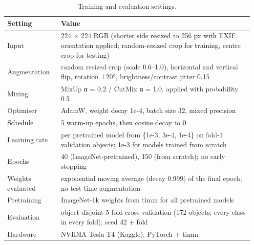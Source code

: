 \begin{table}
\caption{Training and evaluation settings.}
\label{tab:table_training_settings}
\begin{tabular}{ll}
\toprule
Setting & Value \\
\midrule
Input & 224 × 224 RGB (shorter side resized to 256 px with EXIF orientation applied; random-resized crop for training, centre crop for testing) \\
Augmentation & random resized crop (scale 0.6–1.0), horizontal and vertical flip, rotation ±20°, brightness/contrast jitter 0.15 \\
Mixing & MixUp α = 0.2 / CutMix α = 1.0, applied with probability 0.5 \\
Optimiser & AdamW, weight decay 1e-4, batch size 32, mixed precision \\
Schedule & 5 warm-up epochs, then cosine decay to 0 \\
Learning rate & per pretrained model from \{1e-3, 3e-4, 1e-4\} on fold-1 validation objects; 1e-3 for models trained from scratch \\
Epochs & 40 (ImageNet-pretrained), 150 (from scratch); no early stopping \\
Weights evaluated & exponential moving average (decay 0.999) of the final epoch; no test-time augmentation \\
Pretraining & ImageNet-1k weights from timm for all pretrained models \\
Evaluation & object-disjoint 5-fold cross-validation (172 objects; every class in every fold); seed 42 + fold \\
Hardware & NVIDIA Tesla T4 (Kaggle), PyTorch + timm \\
\bottomrule
\end{tabular}
\end{table}
